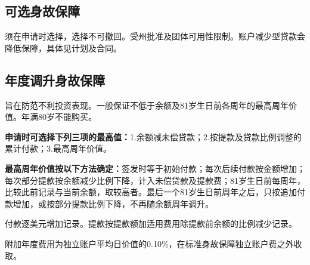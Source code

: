 \documentclass[UTF8,fontset=none,11pt,a4paper]{ctexart}
\begin{document}
\subsection*{可选身故保障}
须在申请时选择，选择不可撤回。受州批准及团体可用性限制。账户减少型贷款会降低保障，具体见计\allowbreak\mbox{划及合同。}


\subsection*{年度调升身故保障}
旨在防范不利投资表现。一般保证不低于余额及81岁生日前各周年的最高周年价值。年满80岁\allowbreak\mbox{不能购买。}


\textbf{申请时可选择下列三项的最高值：}1.余额减未偿贷款；2.按提款及贷款比例调整的累计付款；3.最高\allowbreak\mbox{周年价值。}


\textbf{最高周年价值按以下方法确定：}签发时等于初始付款；每次后续付款按金额增加；每次部分提款按余额减少比例下降，计入未偿贷款及提款费；81岁生日前每周年，比较此前记录与当前余额，取较高者。最后一个81岁生日前周年之后，只按追加付款增加，或按部分提款比例下降，不再随余额\allowbreak\mbox{周年调升。}


付款逐美元增加记录。提款按提款额加适用费用除提款前余额的比例\allowbreak\mbox{减少记录。}


附加年度费用为独立账户平均日价值的0.10\%，在标准身故保障独立账户费\allowbreak\mbox{之外收取。}
\end{document}
